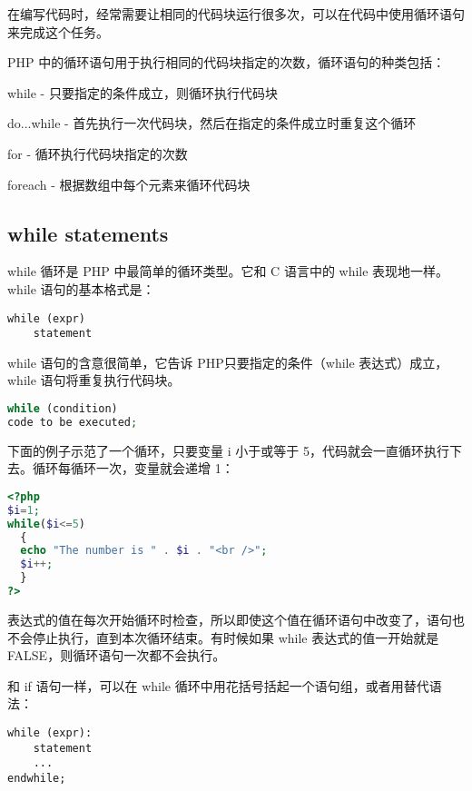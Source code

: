 在编写代码时，经常需要让相同的代码块运行很多次，可以在代码中使用循环语句来完成这个任务。


PHP 中的循环语句用于执行相同的代码块指定的次数，循环语句的种类包括：


\begin{compactitem}
\item while - 只要指定的条件成立，则循环执行代码块
\item do...while - 首先执行一次代码块，然后在指定的条件成立时重复这个循环
\item for - 循环执行代码块指定的次数
\item foreach - 根据数组中每个元素来循环代码块
\end{compactitem}



\subsection{while statements}

while 循环是 PHP 中最简单的循环类型。它和 C 语言中的 while 表现地一样。while 语句的基本格式是：

\begin{verbatim}
while (expr)
    statement
\end{verbatim}

while 语句的含意很简单，它告诉 PHP只要指定的条件（while 表达式）成立，while 语句将重复执行代码块。


\begin{lstlisting}[language=PHP]
while (condition)
code to be executed;
\end{lstlisting}

下面的例子示范了一个循环，只要变量 i 小于或等于 5，代码就会一直循环执行下去。循环每循环一次，变量就会递增 1：

\begin{lstlisting}[language=PHP]
<?php 
$i=1;
while($i<=5)
  {
  echo "The number is " . $i . "<br />";
  $i++;
  }
?>
\end{lstlisting}

表达式的值在每次开始循环时检查，所以即使这个值在循环语句中改变了，语句也不会停止执行，直到本次循环结束。有时候如果 while 表达式的值一开始就是 FALSE，则循环语句一次都不会执行。

和 if 语句一样，可以在 while 循环中用花括号括起一个语句组，或者用替代语法：

\begin{verbatim}
while (expr):
    statement
    ...
endwhile;
\end{verbatim}

